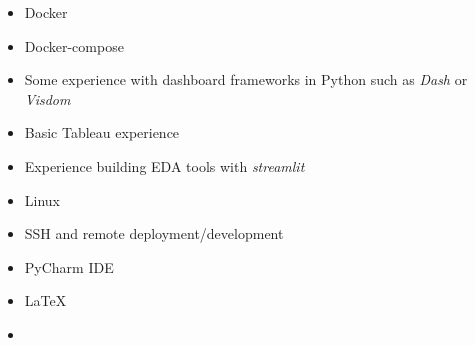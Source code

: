 
\begin{itemize}
\item Docker
\item Docker-compose

\end{itemize}

\begin{itemize}
\item Some experience with dashboard frameworks in Python such as \textit{Dash} or \textit{Visdom}
\item Basic Tableau experience
\item Experience building EDA tools with \textit{streamlit}

\end{itemize}

\begin{itemize}
\item Linux {\faLinux}
\item SSH and remote deployment/development
\item PyCharm IDE
\item \LaTeX
\item  {\faGit}
\end{itemize}

